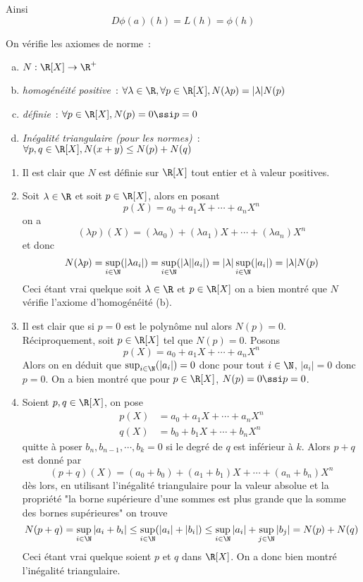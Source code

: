\documentclass{article}
\begin{document}
Ainsi
\[
D\phi(a)(h) = L(h) = \phi(h)
\]

\exercice{}
On vérifie les axiomes de norme~:
\begin{enumerate}[(a)]
\item $N : \R[X] \rightarrow \R^+$
\item \textit{homogénéité positive}~: $\forall \lambda \in \R, \forall p \in \R[X], N(\lambda p) = |\lambda| N(p)$
\item \textit{définie}~: $\forall p \in \R[X], N(p) = 0 \ssi p=0$
\item \textit{Inégalité triangulaire (pour les normes)}~: $\forall p,q \in \R[X], N(x+y) \leq N(p) + N(q)$
\end{enumerate}

\begin{enumerate}[{\bf (a)}]
\item Il est clair que $N$ est définie sur $\R[X]$ tout entier et à valeur positives.
\item Soit $\lambda \in \R$ et soit $p \in \R[X]$, alors en posant
\[
p(X) = a_0 + a_1X + \cdots + a_n X^n
\]
on a
\[
(\lambda p)(X) = (\lambda a_0) + (\lambda a_1)X + \cdots + (\lambda a_n) X^n
\]
et donc \[
N(\lambda p) = \sup_{i\in \N}( \vert \lambda a_i \vert) = \sup_{i\in \N}( \vert \lambda \vert \vert a_i \vert) = \vert \lambda \vert \sup_{i\in \N}(  \vert a_i \vert) = \vert \lambda \vert N(p)
\]
Ceci étant vrai quelque soit $\lambda \in \R$ et $p \in \R[X]$ on a bien montré que $N$ vérifie l'axiome d'homogénéité (b).
\item Il est clair que si $p =0$ est le polynôme nul alors $N(p) = 0$. Réciproquement, soit $p \in \R[X]$ tel que $N(p) = 0$. Posons 
\[
p(X) = a_0 + a_1X + \cdots + a_n X^n
\]
Alors on en déduit que $\sup_{i\in \N}( \vert a_i \vert) = 0$ donc pour tout $i \in \N$, $\vert a_i \vert  = 0$ donc $p = 0$.
On a bien montré que pour $p \in \R[X]$, $N(p) = 0 \ssi p = 0$.
\item Soient $p,q \in \R[X]$, on pose
\begin{align*}
p(X) &= a_0 + a_1X + \cdots + a_n X^n\\
q(X) &= b_0 + b_1X + \cdots + b_n X^n
\end{align*}
quitte à poser $b_n, b_{n-1}, \cdots, b_k = 0$ si le degré de $q$ est inférieur à $k$.
Alors $p+q$ est donné par
\[
(p+q)(X) = (a_0+b_0) + (a_1+b_1)X + \cdots + (a_n+b_n) X^n
\]
dès lors, en utilisant l'inégalité triangulaire pour la valeur absolue et la propriété "la borne supérieure d'une sommes est plus grande que la somme des bornes supérieures" on trouve
\[
N(p+q) = \sup_{i \in \N} \vert a_i + b_i \vert \leq \sup_{i \in \N} (\vert a_i \vert  + \vert b_i \vert ) \leq \sup_{i \in \N}\vert a_i \vert  + \sup_{j \in \N}\vert b_j \vert = N(p) + N(q)
\]
Ceci étant vrai quelque soient $p$ et $q$ dans $\R[X]$. On a donc bien montré l'inégalité triangulaire.
\end{enumerate}
\end{document}

